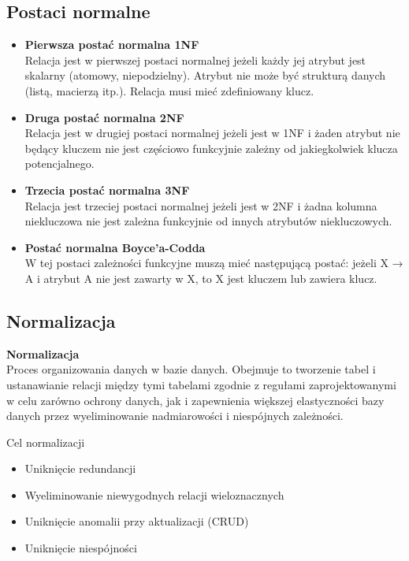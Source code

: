 \documentclass[main.tex]{subfiles}
\begin{document}
    \subsection{Postaci normalne}

    \begin{itemize}
        \item \textbf{Pierwsza postać normalna 1NF}\\
        Relacja jest w pierwszej postaci normalnej jeżeli każdy jej atrybut jest skalarny (atomowy, niepodzielny). Atrybut nie może być strukturą danych (listą, macierzą itp.). Relacja musi mieć zdefiniowany klucz.
        \item \textbf{Druga postać normalna 2NF}\\
        Relacja jest w drugiej postaci normalnej jeżeli jest w 1NF i żaden atrybut nie będący kluczem nie jest częściowo funkcyjnie zależny od jakiegkolwiek klucza potencjalnego.
        \item \textbf{Trzecia postać normalna 3NF}\\
        Relacja jest trzeciej postaci normalnej jeżeli jest w 2NF i żadna kolumna niekluczowa nie jest zależna funkcyjnie od innych atrybutów niekluczowych.
        \item \textbf{Postać normalna Boyce'a-Codda}\\
        W tej postaci zależności funkcyjne muszą mieć następującą postać: jeżeli X → A i atrybut A nie jest zawarty w X, to X jest kluczem lub zawiera klucz.
    \end{itemize}

    \subsection{Normalizacja}
    \begin{definition}
        \textbf{Normalizacja}\\
        Proces organizowania danych w bazie danych. Obejmuje to tworzenie tabel i ustanawianie relacji między tymi tabelami zgodnie z regułami zaprojektowanymi w celu zarówno ochrony danych, jak i zapewnienia większej elastyczności bazy danych przez wyeliminowanie nadmiarowości i niespójnych zależności.
    \end{definition}

    Cel normalizacji
    \begin{itemize}
        \item Uniknięcie redundancji
        \item Wyeliminowanie niewygodnych relacji wieloznacznych
        \item Uniknięcie anomalii przy aktualizacji (CRUD)
        \item Uniknięcie niespójności
    \end{itemize}
\end{document}
